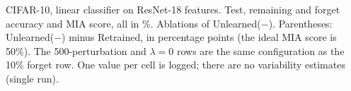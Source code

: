 \begin{table}[t]
  \centering
  
  \caption{CIFAR-10, linear classifier on ResNet-18 features. Test, remaining and forget accuracy and MIA score, all in \%. Ablations of Unlearned($-$). Parentheses: Unlearned($-$) minus Retrained, in percentage points (the ideal MIA score is 50\%). The 500-perturbation and $\lambda{=}0$ rows are the same configuration as the 10\% forget row. One value per cell is logged; there are no variability estimates (single run).}
  \label{tab:ablations}
\end{table}
